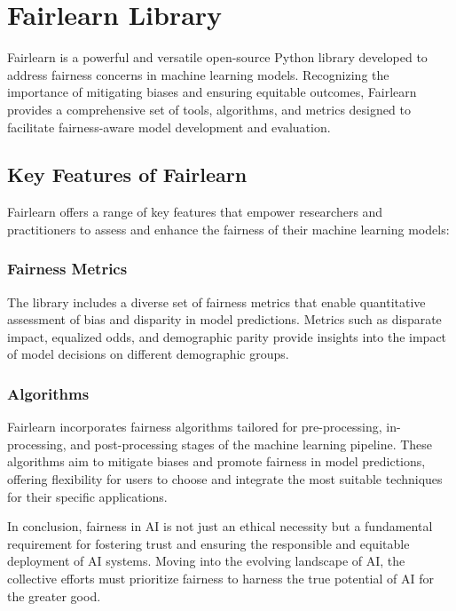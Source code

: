 \documentclass[12pt,a4paper,openright,twoside]{book}
\begin{document}
\newpage
\section{Fairlearn Library}

Fairlearn is a powerful and versatile open-source Python library developed to address fairness concerns in machine learning models. Recognizing the importance of mitigating biases and ensuring equitable outcomes, Fairlearn provides a comprehensive set of tools, algorithms, and metrics designed to facilitate fairness-aware model development and evaluation.

\subsection{Key Features of Fairlearn}

Fairlearn offers a range of key features that empower researchers and practitioners to assess and enhance the fairness of their machine learning models:

\subsubsection{Fairness Metrics}

The library includes a diverse set of fairness metrics that enable quantitative assessment of bias and disparity in model predictions. Metrics such as disparate impact, equalized odds, and demographic parity provide insights into the impact of model decisions on different demographic groups.

\subsubsection{Algorithms}

Fairlearn incorporates fairness algorithms tailored for pre-processing, in-processing, and post-processing stages of the machine learning pipeline. These algorithms aim to mitigate biases and promote fairness in model predictions, offering flexibility for users to choose and integrate the most suitable techniques for their specific applications.

In conclusion, fairness in AI is not just an ethical necessity but a fundamental requirement for fostering trust and ensuring the responsible and equitable deployment of AI systems. Moving into the evolving landscape of AI, the collective efforts must prioritize fairness to harness the true potential of AI for the greater good.
\end{document}
